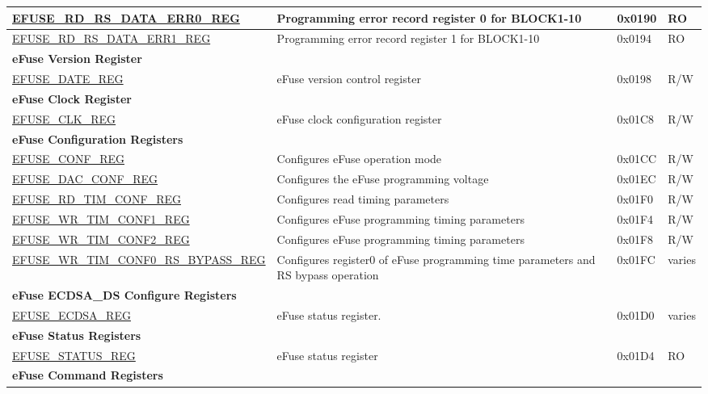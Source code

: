 \begin{longtable}{ | p{7.2cm} | p{6cm} | p{1.3cm} | p{1cm} | }
\hyperref[regdesc:EFUSERDRSDATAERR0REG]{EFUSE\_RD\_RS\_DATA\_ERR0\_REG} & Programming error record register 0 for BLOCK1-10 & 0x0190 & RO \\ \hline
\hyperref[regdesc:EFUSERDRSDATAERR1REG]{EFUSE\_RD\_RS\_DATA\_ERR1\_REG} & Programming error record register 1 for BLOCK1-10 & 0x0194 & RO \\ \hline
\multicolumn{4}{|l|}{\textbf{eFuse Version Register}} \\ \hline
\hyperref[regdesc:EFUSEDATEREG]{EFUSE\_DATE\_REG} & eFuse version control register & 0x0198 & R/W \\ \hline
\multicolumn{4}{|l|}{\textbf{eFuse Clock Register}} \\ \hline
\hyperref[regdesc:EFUSECLKREG]{EFUSE\_CLK\_REG} & eFuse clock configuration register & 0x01C8 & R/W \\ \hline
\multicolumn{4}{|l|}{\textbf{eFuse Configuration Registers}} \\ \hline
\hyperref[regdesc:EFUSECONFREG]{EFUSE\_CONF\_REG} & Configures eFuse operation mode & 0x01CC & R/W \\ \hline
\hyperref[regdesc:EFUSEDACCONFREG]{EFUSE\_DAC\_CONF\_REG} & Configures the eFuse programming voltage & 0x01EC & R/W \\ \hline
\hyperref[regdesc:EFUSERDTIMCONFREG]{EFUSE\_RD\_TIM\_CONF\_REG} & Configures read timing parameters & 0x01F0 & R/W \\ \hline
\hyperref[regdesc:EFUSEWRTIMCONF1REG]{EFUSE\_WR\_TIM\_CONF1\_REG} & Configures eFuse programming timing parameters & 0x01F4 & R/W \\ \hline
\hyperref[regdesc:EFUSEWRTIMCONF2REG]{EFUSE\_WR\_TIM\_CONF2\_REG} & Configures eFuse programming timing parameters & 0x01F8 & R/W \\ \hline
\hyperref[regdesc:EFUSEWRTIMCONF0RSBYPASSREG]{EFUSE\_WR\_TIM\_CONF0\_RS\_BYPASS\_REG} & Configures register0 of eFuse programming time parameters and RS bypass operation & 0x01FC & varies \\ \hline
\multicolumn{4}{|l|}{\textbf{eFuse ECDSA\_DS Configure Registers}} \\ \hline
\hyperref[regdesc:EFUSEECDSAREG]{EFUSE\_ECDSA\_REG} & eFuse status register. & 0x01D0 & varies \\ \hline
\multicolumn{4}{|l|}{\textbf{eFuse Status Registers}} \\ \hline\hyperref[regdesc:EFUSESTATUSREG]{EFUSE\_STATUS\_REG} & eFuse status register & 0x01D4 & RO \\ \hline
\multicolumn{4}{|l|}{\textbf{eFuse Command Registers}} \\ \hline

\end{longtable}

